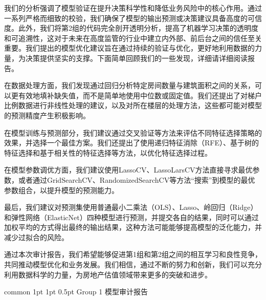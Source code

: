 \documentclass[
    report,     %
    oneside,    %
    UTF8,       %
    zihao=-4    %
]{config} %
\def \minorTitleCN {Group 1 模型审计报告} %
\begin{document}
我们的分析强调了模型验证在提升决策科学性和降低业务风险中的核心作用。通过一系列严格而细致的校验，我们确保了模型的输出预测或决策建议具备高度的可信度。此外，我们将第2组的代码完全剖开透明分析，提高了机器学习决策的透明度和可追溯性，这对于未来在高度监管的行业中建立内外部、前后台之间的信任至关重要。我们提出的模型优化建议旨在通过持续的验证与优化，更好地利用数据的力量，为决策提供坚实的支撑。下面简单回顾我们的一些发现，详细请详细阅读报告。

在数据处理方面，我们发现通过回归分析特定房间数量与建筑面积之间的关系，可以更有效地填补缺失值，而不是简单地使用中位数或固定值。我们还提出了对梯户比例数据进行非线性处理的建议，以及对所在楼层的处理方法，这些都可能对模型的预测精度产生积极影响。

在模型训练与预测部分，我们建议通过交叉验证等方法来评估不同特征选择策略的效果，并选择一个最佳方案。我们还提出了使用递归特征消除（RFE）、基于树的特征选择和基于相关性的特征选择等方法，以优化特征选择过程。

在模型参数调优方面，我们建议使用LassoCV、LassoLarsCV方法直接寻求最优参数，或者通过GridSearchCV、RandomizedSearchCV等方法“搜索”到模型的最优参数组合，以提升模型的预测能力。

最后，我们建议对预测集使用普通最小二乘法（OLS）、Lasso、岭回归（Ridge）和弹性网络（ElasticNet）四种模型进行预测，并提交各自的结果，同时可以通过加权平均的方式得出最终的输出结果，这种方法可能能够提高模型的泛化能力，并减少过拟合的风险。

通过本次审计报告，我们希望能够促进第1组和第2组之间的相互学习和良性竞争，共同推动模型优化和业务发展。我们相信，通过不断的努力和创新，我们可以充分利用数据科学的力量，为房地产估值领域带来更多的突破和进步。









\Header
    {common} %
    {1pt} %
    {1pt} %
    {0.5pt} %
    {} %
    {\minorTitleCN}
    {} %
\end{document}
